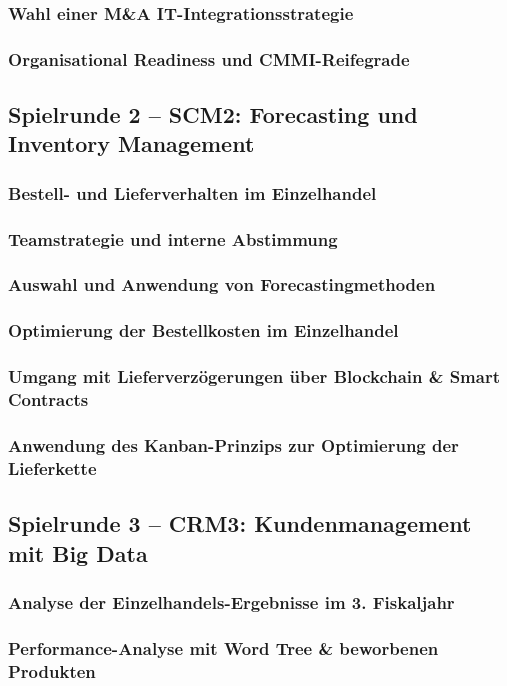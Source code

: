 \documentclass[a4paper,12pt]{article}
\begin{document}
\subsubsection{Wahl einer M\&A IT-Integrationsstrategie}
\subsubsection{Organisational Readiness und CMMI-Reifegrade}

\newpage
\subsection{Spielrunde 2 – SCM2: Forecasting und Inventory Management}
\subsubsection{Bestell- und Lieferverhalten im Einzelhandel}
\subsubsection{Teamstrategie und interne Abstimmung}
\subsubsection{Auswahl und Anwendung von Forecastingmethoden}
\subsubsection{Optimierung der Bestellkosten im Einzelhandel}
\subsubsection{Umgang mit Lieferverzögerungen über Blockchain \& Smart Contracts}
\subsubsection{Anwendung des Kanban-Prinzips zur Optimierung der Lieferkette}

\newpage
\subsection{Spielrunde 3 – CRM3: Kundenmanagement mit Big Data}
\subsubsection{Analyse der Einzelhandels-Ergebnisse im 3. Fiskaljahr}
\subsubsection{ Performance-Analyse mit Word Tree \& beworbenen Produkten}
\end{document}
